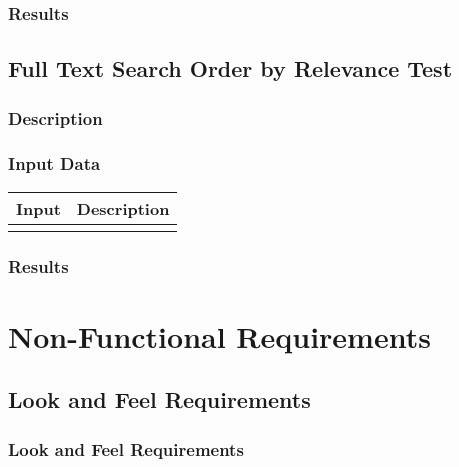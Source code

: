\documentclass{scrreprt}
\begin{document}
\subsection{Results}

\section{Full Text Search Order by Relevance Test}
\subsection{Description}
\begin{flushleft}
\end{flushleft}
\subsection{Input Data}
 \centering
 \begin{tabular}{p{3cm}p{6cm}}
 \hline\hline
 Input & Description\\
 \hline\hline
   &  \\ %
 \hline
 \end{tabular}
\subsection{Results}

\chapter{Non-Functional Requirements}

\section{Look and Feel Requirements}
\subsection{Look and Feel Requirements}
\end{document}
